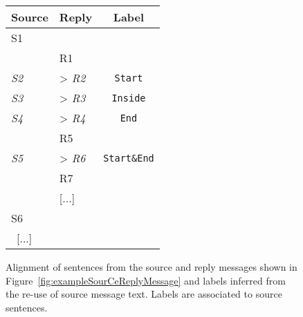 \begin{figure}
\begin{minipage}{.63\textwidth}
        \caption{Example of a source message and its reply. Pseudo-sentences have been marked. %
        }\label{fig:exampleSourCeReplyMessage}
\end{minipage}
\hfill
\begin{minipage}{.3\textwidth}
\small\centering
\begin{tabular}{*{2}{|l}|c|}
\toprule
\textbf{Source} & \textbf{Reply} & \textbf{Label}\\
	\midrule
S1  & & \\
    & R1 & \\
\textit{S2}  & > \textit{R2}& \texttt{Start}\\
\textit{S3}  & > \textit{R3}& \texttt{Inside}\\
\textit{S4}  & > \textit{R4}& \texttt{End}\\
    & R5 & \\
\textit{S5}  & > \textit{R6} & \texttt{Start\&End}\\
    & R7 & \\
    & [...] & \\
S6    &  & \\ \ 
[...] \    &  & \\
	\bottomrule
\end{tabular}

\caption{Alignment of sentences from the source and reply messages shown in Figure~\ref{fig:exampleSourCeReplyMessage} and labels inferred from the re-use of source message text. Labels are associated to source sentences.}
\label{fig:exampleSegmentationLabels}
\end{minipage}

\end{figure}




